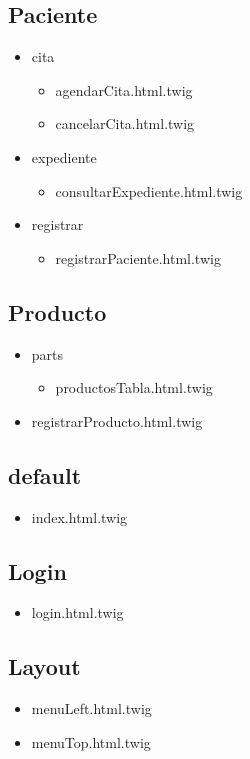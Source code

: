 		\subsection{Paciente}
		\begin{itemize}
			\item cita
			\begin{itemize}
				\item agendarCita.html.twig
				\item cancelarCita.html.twig
			\end{itemize}
			\item expediente
			\begin{itemize}
				\item consultarExpediente.html.twig
			\end{itemize}
			\item registrar
			\begin{itemize}
			\item registrarPaciente.html.twig
			\end{itemize}
			
		\end{itemize}
		\subsection{Producto}	
			\begin{itemize}
			\item parts
			\begin{itemize}
				\item productosTabla.html.twig
			\end{itemize}
			\item registrarProducto.html.twig
			\end{itemize}

		\subsection{default}
		\begin{itemize}
			\item index.html.twig
		\end{itemize}
		\subsection{Login}
		\begin{itemize}
			\item login.html.twig
		\end{itemize}
		\subsection{Layout}
		\begin{itemize}
			\item menuLeft.html.twig
			\item menuTop.html.twig
		\end{itemize}
